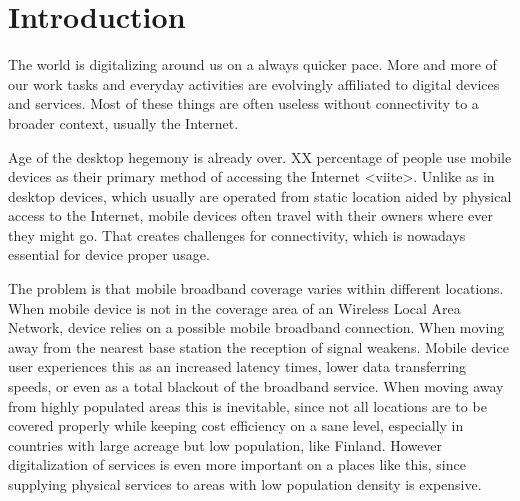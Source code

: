 \chapter{Introduction}



The world is digitalizing around us on a always quicker pace. More and more of our work tasks and everyday activities are evolvingly affiliated to digital devices and services. Most of these things are often useless without connectivity to a broader context, usually the Internet.

Age of the desktop hegemony is already over. XX percentage of people use mobile devices as their primary method of accessing the Internet <viite>. Unlike as in desktop devices, which usually are operated from static location aided by physical access to the Internet, mobile devices often travel with their owners where ever they might go. That creates challenges for connectivity, which is nowadays essential for device proper usage. 

The problem is that mobile broadband coverage varies within different locations. When mobile device is not in the coverage area of an Wireless Local Area Network, device relies on a possible mobile broadband connection. When moving away from the nearest base station the reception of signal weakens. Mobile device user experiences this as an increased latency times, lower data transferring speeds, or even as a total blackout of the broadband service. When moving away from highly populated areas this is inevitable, since not all locations are to be covered properly while keeping cost efficiency on a sane level, especially in countries with large acreage but low population, like Finland. However digitalization of services is even more important on a places like this, since supplying physical services to areas with low population density is expensive. 


